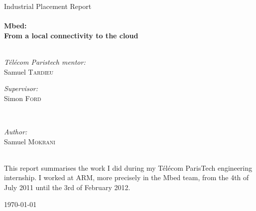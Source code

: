 \begin{titlepage}
\begin{center}
\LARGE Industrial Placement Report\\[0.5cm]
\HRule \\
{ \huge \bfseries Mbed: \\ From a local connectivity to the cloud}\\

\HRule \\[1cm]

\begin{minipage}{0.4\textwidth}
\begin{flushleft} \large
\emph{T\'{e}l\'{e}com Paristech mentor:}\\
Samuel \textsc{Tardieu}
\end{flushleft}
\end{minipage}
\begin{minipage}{0.4\textwidth}
\begin{flushright} \large
\emph{Supervisor:} \\
Simon \textsc{Ford}
\end{flushright}
\end{minipage}\\[1.0cm]


\begin{minipage}{0.4\textwidth}
\begin{center} \large
\emph{Author:} \\
Samuel \textsc{Mokrani}
\end{center}
\end{minipage}\\[3.0cm]

\large This report summarises the work I did during my T\'{e}l\'{e}com ParisTech engineering internship. I worked at ARM, more precisely in the Mbed team, from the 4th of July 2011 until the 3rd of February 2012.



\vfill

{\large \today}

\end{center}

\end{titlepage}